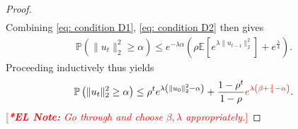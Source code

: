 \documentclass[journal,onecolumn,11pt,final]{IEEEtran}
\newcommand{\1}{\mathbb{1}}
\theoremstyle{plain}
\theoremstyle{definition}
\theoremstyle{plain}
\theoremstyle{plain}
\theoremstyle{definition}
\newcommand{\ELnote}[1]{\textcolor{red}{[{\em {\bf **EL Note:} #1}]}}
\newcommand{\red}[1]{\textcolor{red}{#1}}
\newcommand{\E}{\mathbb{E}}
\renewcommand{\P}{\mathbb{P}}
\begin{document}
\begin{proof}
\begin{align}
	\end{align}
	Combining \eqref{eq: condition D1}, \eqref{eq: condition D2} then gives
	\begin{align*}
		\P\left( \|u_t\|_2^2 \geq \alpha \right) \leq e^{-\lambda \alpha}\left( \rho\E\left[ e^{\lambda \|u_{t-1}\|_2^2} \right] + e^{\frac{\lambda}{4}}\right).
	\end{align*}
	Proceeding inductively thus yields
	\begin{align*}
		\P\left( \|u_t\|_2^2 \geq \alpha \right) \leq \rho^t e^{\lambda \left(\|u_0\|_2^2 - \alpha \right)} + \frac{1-\rho^t}{1-\rho} \red{e^{\lambda \left(\beta + \frac{1}{4} - \alpha \right)}}.
	\end{align*}
	\ELnote{Go through and choose \(\beta, \lambda\) appropriately.}
\end{proof}
\end{document}
